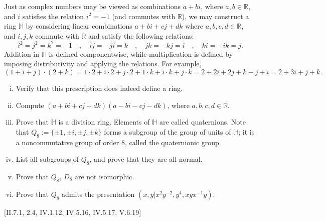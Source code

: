 \documentclass[12pt,letterpaper,boxed]{hmcpset}
\newcommand{\R}{\mathbb{R}}
\begin{document}
\hypertarget{Exercise III.1.4}{}
\begin{problem}[1.12]
	Just as complex numbers may be viewed as combinations $a+bi$, where
	$a,b\in \R$, and $i$ satisfies the relation $i^2=-1$ (and commutes with $\R$), we may construct a ring $\mathbb{H}$ by considering linear combinations $a + bi + cj + dk$ where $a, b, c, d \in \R$, and $i, j, k$ commute with $\R$ and satisfy the following relations:
	\[
	i^{2}=j^{2}=k^{2}=-1 \quad, \quad i j=-j i=k \quad, \quad j k=-k j=i \quad, \quad k i=-i k=j.
	\]
	Addition in $\mathbb{H}$ is defined componentwise, while multiplication is defined by imposing	distributivity and applying the relations. For example,
	\[
	(1+i+j) \cdot(2+k)=1 \cdot 2+i \cdot 2+j \cdot 2+1 \cdot k+i \cdot k+j \cdot k=2+2 i+2 j+k-j+i=2+3 i+j+k.
	\]
	\begin{enumerate}[(i)]
		\item Verify that this prescription does indeed define a ring.
		\item Compute $(a+b i+c j+d k)(a-b i-c j-d k)$, where $a, b, c, d \in \R$.
		\item Prove that $\mathbb{H}$ is a division ring. Elements of $\mathbb{H}$ are called quaternions. Note that $Q_8 := \{\pm1,\pm i,\pm j,\pm k\}$ forms a subgroup of the group of units of $\mathbb{H}$; it is a noncommutative group of order 8, called the quaternionic group.
		\item  List all subgroups of $Q_8$, and prove that they are all normal.
		\item  Prove that $Q_8$, $D_8$ are not isomorphic.
		\item  Prove that $Q_8$ admits the presentation $\left(x, y | x^{2} y^{-2}, y^{4}, x y x^{-1} y\right)$.
	\end{enumerate}
	[\textsection II.7.1, 2.4, IV.1.12, IV.5.16, IV.5.17, V.6.19]
\end{problem}
\end{document}
